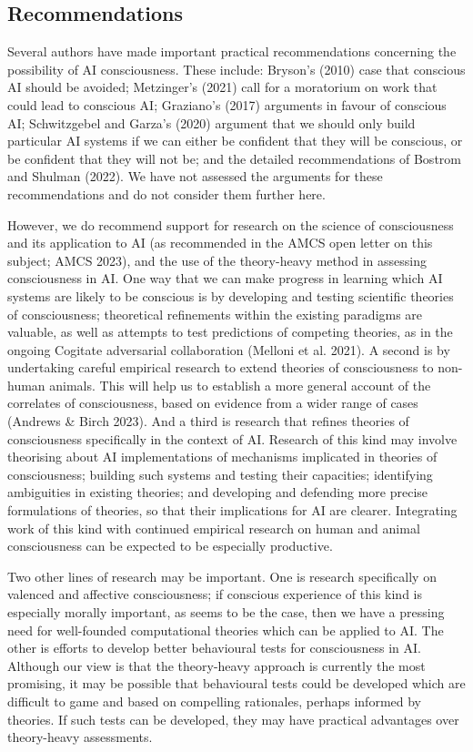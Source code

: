 \documentclass[12pt]{article}
\begin{document}
\subsection{Recommendations}

Several authors have made important practical recommendations concerning the possibility of AI consciousness. These include: Bryson’s (2010) case that conscious AI should be avoided; Metzinger’s (2021) call for a moratorium on work that could lead to conscious AI; Graziano’s (2017) arguments in favour of conscious AI; Schwitzgebel and Garza’s (2020) argument that we should only build particular AI systems if we can either be confident that they will be conscious, or be confident that they will not be; and the detailed recommendations of Bostrom and Shulman (2022). We have not assessed the arguments for these recommendations and do not consider them further here.

However, we do recommend support for research on the science of consciousness and its application to AI (as recommended in the AMCS open letter on this subject; AMCS 2023), and the use of the theory-heavy method in assessing consciousness in AI. One way that we can make progress in learning which AI systems are likely to be conscious is by developing and testing scientific theories of consciousness; theoretical refinements within the existing paradigms are valuable, as well as attempts to test predictions of competing theories, as in the ongoing Cogitate adversarial collaboration (Melloni et al. 2021). A second is by undertaking careful empirical research to extend theories of consciousness to non-human animals. This will help us to establish a more general account of the correlates of consciousness, based on evidence from a wider range of cases (Andrews \& Birch 2023). And a third is research that refines theories of consciousness specifically in the context of AI. Research of this kind may involve theorising about AI implementations of mechanisms implicated in theories of consciousness; building such systems and testing their capacities; identifying ambiguities in existing theories; and developing and defending more precise formulations of theories, so that their implications for AI are clearer. Integrating work of this kind with continued empirical research on human and animal consciousness can be expected to be especially productive.

Two other lines of research may be important. One is research specifically on valenced and affective consciousness; if conscious experience of this kind is especially morally important, as seems to be the case, then we have a pressing need for well-founded computational theories which can be applied to AI. The other is efforts to develop better behavioural tests for consciousness in AI. Although our view is that the theory-heavy approach is currently the most promising, it may be possible that behavioural tests could be developed which are difficult to game and based on compelling rationales, perhaps informed by theories. If such tests can be developed, they may have practical advantages over theory-heavy assessments.
\end{document}
